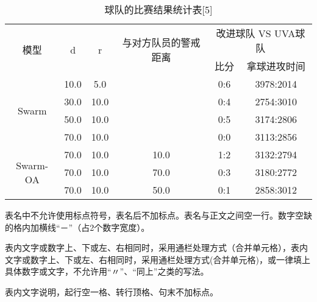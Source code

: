 \begin{table}[]
	\caption[表3.2]{球队的比赛结果统计表[5]}
	\label{biao3.2}
	\begin{tabular}{cccccc}
		\hline
		\multirow{2}{*}{模型}       & \multirow{2}{*}{d} & \multirow{2}{*}{r} & \multirow{2}{*}{与对方队员的警戒距离} & \multicolumn{2}{c}{改进球队 VS UVA球队} \\ \cline{5-6} 
		&                    &                    &                             & 比分           & 拿球进攻时间             \\ \hline
		\multirow{4}{*}{Swarm}    & 10.0               & 5.0                &                             & 0:6          & 3978:2014          \\ 
		& 30.0               & 10.0               &                             & 0:4          & 2754:3010          \\ 
		& 50.0               & 10.0               &                             & 0:5          & 3174:2806          \\  
		& 70.0               & 10.0               &                             & 0:0          & 3113:2856          \\\hline
		\multirow{3}{*}{Swarm-OA} & 70.0               & 10.0               & 10.0                        & 1:2          & 3132:2794          \\
		& 70.0               & 10.0               & 70.0                        & 0:3          & 3180:2772          \\
		& 70.0               & 10.0               & 50.0                        & 0:1          & 2858:3012         \\ \hline
	\end{tabular} 
\end{table}

表名中不允许使用标点符号，表名后不加标点。表名与正文之间空一行。数字空缺的格内加横线“－”（占2个数字宽度）。

表内文字或数字上、下或左、右相同时，采用通栏处理方式（合并单元格），表内文字或数字上、下或左、右相同时，采用通栏处理方式(合并单元格)，或一律填上具体数字或文字，不允许用“〃”、“同上”之类的写法。

表内文字说明，起行空一格、转行顶格、句末不加标点。

